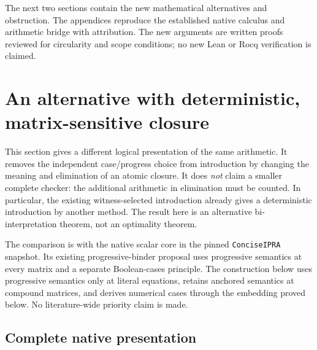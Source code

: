 \documentclass[11pt,letterpaper]{article}
\theoremstyle{definition}
\theoremstyle{remark}
\begin{document}
The next two sections contain the new mathematical alternatives and
obstruction. The appendices reproduce the established native calculus
and arithmetic bridge with attribution. The new arguments are written
proofs reviewed for circularity and scope conditions; no new Lean or
Rocq verification is claimed.




\section{An alternative with deterministic, matrix-sensitive closure}
\label{sec:mixed-closure}

This section gives a different logical presentation of the same arithmetic.
It removes the independent case/progress choice from introduction by changing
the meaning and elimination of an atomic closure.  It does \emph{not} claim
a smaller complete checker: the additional arithmetic in elimination must
be counted.  In particular, the existing witness-selected introduction
already gives a deterministic introduction by another method.  The result
here is an alternative bi-interpretation theorem, not an optimality theorem.

The comparison is with the native scalar core in the pinned
\texttt{ConciseIPRA} snapshot.  Its existing progressive-binder proposal uses
progressive semantics at every matrix and a separate Boolean-cases principle.
The construction below uses progressive semantics only at literal equations,
retains anchored semantics at compound matrices, and derives numerical cases
through the embedding proved below.  No literature-wide priority claim is made.

\subsection{Complete native presentation}
\end{document}
